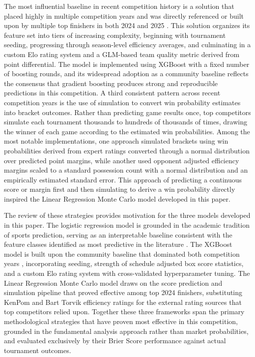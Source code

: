 \documentclass[12pt,leqno]{article}\usepackage[pdftex]{graphicx}\usepackage[dvipsnames]{xcolor}
\theoremstyle{remark}
\begin{document}
The most influential baseline in recent competition history is a solution that placed highly in multiple competition years and was directly referenced or built upon by multiple top finishers in both 2024 and 2025 \cite{raddar}. This solution organizes its feature set into tiers of increasing complexity, beginning with tournament seeding, progressing through season-level efficiency averages, and culminating in a custom Elo rating system and a GLM-based team quality metric derived from point differential. The model is implemented using XGBoost with a fixed number of boosting rounds, and its widespread adoption as a community baseline reflects the consensus that gradient boosting produces strong and reproducible predictions in this competition. A third consistent pattern across recent competition years is the use of simulation to convert win probability estimates into bracket outcomes. Rather than predicting game results once, top competitors simulate each tournament thousands to hundreds of thousands of times, drawing the winner of each game according to the estimated win probabilities. Among the most notable implementations, one approach simulated brackets using win probabilities derived from expert ratings converted through a normal distribution over predicted point margins, while another used opponent adjusted efficiency margins scaled to a standard possession count with a normal distribution and an empirically estimated standard error. This approach of predicting a continuous score or margin first and then simulating to derive a win probability directly inspired the Linear Regression Monte Carlo model developed in this paper.

The review of these strategies provides motivation for the three models developed in this paper. The logistic regression model is grounded in the academic tradition of sports prediction, serving as an interpretable baseline consistent with the feature classes identified as most predictive in the literature \cite{Schwertman, Sokol2026, Zimmermann}. The XGBoost model is built upon the community baseline that dominated both competition years \cite{raddar}, incorporating seeding, strength of schedule adjusted box score statistics, and a custom Elo rating system with cross-validated hyperparameter tuning. The Linear Regression Monte Carlo model draws on the score prediction and simulation pipeline that proved effective among top 2024 finishers, substituting KenPom and Bart Torvik efficiency ratings for the external rating sources that top competitors relied upon. Together these three frameworks span the primary methodological strategies that have proven most effective in this competition, grounded in the fundamental analysis approach rather than market probabilities, and evaluated exclusively by their Brier Score performance against actual tournament outcomes.
\end{document}
